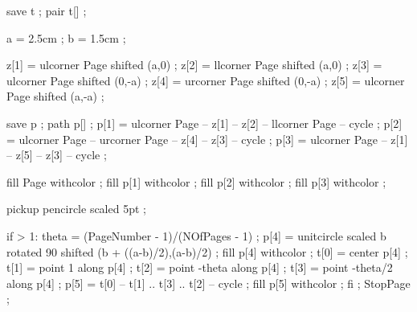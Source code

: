 save t ;
pair  t[] ;

a = 2.5cm ;
b = 1.5cm ;

z[1] = ulcorner Page shifted (a,0) ;
z[2] = llcorner Page shifted (a,0) ;
z[3] = ulcorner Page shifted (0,-a) ;
z[4] = urcorner Page shifted (0,-a) ;
z[5] = ulcorner Page shifted (a,-a) ;

save p ;
path p[] ;
p[1] = ulcorner Page -- z[1] -- z[2] -- llcorner Page -- cycle ;
p[2] = ulcorner Page -- urcorner Page -- z[4] -- z[3] -- cycle ;
p[3] = ulcorner Page -- z[1] -- z[5] -- z[3] -- cycle ;

fill Page withcolor  ;
fill p[1] withcolor  ;
fill p[2] withcolor  ;
fill p[3] withcolor  ;

pickup pencircle scaled 5pt ;

if \realfolio > 1:
	theta = (PageNumber - 1)/(NOfPages - 1) ;
	p[4] = unitcircle scaled b rotated 90 shifted (b + ((a-b)/2),(a-b)/2) ;
	fill p[4] withcolor  ;
	t[0] = center p[4] ;
	t[1] = point 1 along p[4] ;
	t[2] = point -theta along p[4] ;
	t[3] = point -theta/2 along p[4] ;
	p[5] = t[0] -- t[1] .. t[3] .. t[2] -- cycle ;
	fill p[5] withcolor  ;
fi ;
StopPage ;
\stopuseMPgraphic





\setupTitle[\c!headcolor={simpleslides:contrastcolor}]


\setupSlideTitle
   [\c!after=,
    \c!alternative=layer,
    \c!width=\textwidth,
    \c!height=2.5cm,
    \c!color=simpleslides:backgroundcolor]


\setupitemize[1][inmargin][color=simpleslides:backgroundcolor]

\protect
\stopmodule

\endinput

